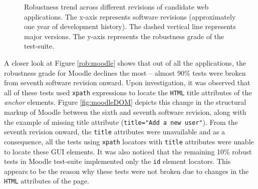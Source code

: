 \begin{figure}[!htbp]
\vspace{-2mm}
  \captionsetup{justification=justified,
singlelinecheck=false}
\caption{Robustness trend across different revisions of candidate web applications. The x-axis represents software revisions (approximately one year of development history). The dashed vertical line represents major versions. The y-axis represents the robustness grade of the test-suite.}
\label{fig:robustnessplots}
\end{figure} 

A closer look at Figure \ref{rob:moodle} shows that out of all the applications, the robustness grade for Moodle declines the most -- almost 90\% tests were broken from seventh software revision onward. Upon investigation, it was observed that all of these tests used \texttt{xpath} expressions to locate the \texttt{HTML} title attributes of the \textit{anchor} elements. 
Figure \ref{fig:moodleDOM} depicts this change in the structural markup of Moodle between the sixth and seventh software revision, along with the example of missing title attribute (\texttt{title="Add a new user"}). From the seventh revision onward, the \texttt{title} attributes were unavailable and as a consequence, all the tests using \texttt{xpath} locators with \texttt{title} attributes were unable to locate these GUI elements. 
It was also noticed that the remaining 10\% robust tests in Moodle test-suite implemented only the \texttt{id} element locators. This appears to be the reason why these tests were not broken due to changes in the \texttt{HTML} attributes of the page.


